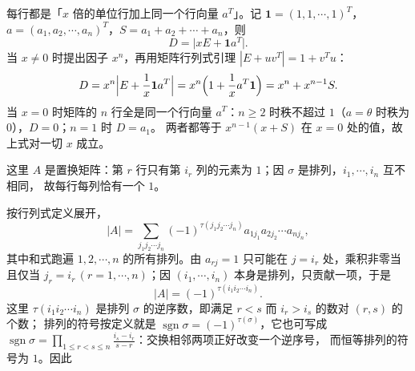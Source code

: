 
\begin{solution}
每行都是「$x$ 倍的单位行加上同一个行向量 $a^{T}$」。记
$\mathbf{1}=(1,1,\cdots,1)^{T}$，$a=(a_{1},a_{2},\cdots,a_{n})^{T}$，$S=a_{1}+a_{2}+\cdots+a_{n}$，则
\[
D=\bigl|xE+\mathbf{1}a^{T}\bigr| .
\]
当 $x\ne0$ 时提出因子 $x^{n}$，再用矩阵行列式引理 $|E+uv^{T}|=1+v^{T}u$：
\[
D=x^{n}\Bigl|E+\frac1x\mathbf{1}a^{T}\Bigr|
=x^{n}\Bigl(1+\frac1x a^{T}\mathbf{1}\Bigr)=x^{n}+x^{n-1}S .
\]
当 $x=0$ 时矩阵的 $n$ 行全是同一个行向量 $a^{T}$：$n\ge2$ 时秩不超过 $1$（$a=\theta$ 时秩为 $0$），$D=0$；$n=1$ 时 $D=a_{1}$。
两者都等于 $x^{n-1}(x+S)$ 在 $x=0$ 处的值，故上式对一切 $x$ 成立。
\end{solution}

\begin{solution}
这里 $A$ 是置换矩阵：第 $r$ 行只有第 $i_{r}$ 列的元素为 $1$；因 $\sigma$ 是排列，$i_{1},\cdots,i_{n}$ 互不相同，
故每行每列恰有一个 $1$。

按行列式定义展开，
\[
|A|=\sum_{j_{1}j_{2}\cdots j_{n}}(-1)^{\tau(j_{1}j_{2}\cdots j_{n})}
a_{1j_{1}}a_{2j_{2}}\cdots a_{nj_{n}},
\]
其中和式跑遍 $1,2,\cdots,n$ 的所有排列。由 $a_{rj}=1$ 只可能在 $j=i_{r}$ 处，乘积非零当且仅当
$j_{r}=i_{r}\,(r=1,\cdots,n)$；因 $(i_{1},\cdots,i_{n})$ 本身是排列，只贡献一项，于是
\[
|A|=(-1)^{\tau(i_{1}i_{2}\cdots i_{n})}.
\]
这里 $\tau(i_{1}i_{2}\cdots i_{n})$ 是排列 $\sigma$ 的逆序数，即满足 $r<s$ 而 $i_{r}>i_{s}$ 的数对 $(r,s)$ 的个数；
排列的符号按定义就是 $\operatorname{sgn}\sigma=(-1)^{\tau(\sigma)}$，它也可写成
$\operatorname{sgn}\sigma=\displaystyle\prod_{1\le r<s\le n}\frac{i_{s}-i_{r}}{s-r}$：交换相邻两项正好改变一个逆序号，
而恒等排列的符号为 $1$。因此
\end{solution}

